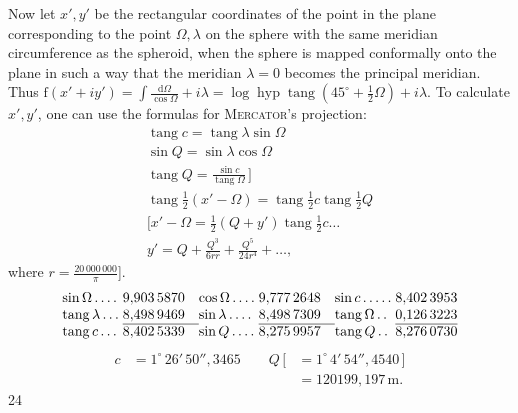 Now let \(x',y'\) be the rectangular coordinates of the point in the plane corresponding to the point \(\Omega,\lambda\) on the sphere with the same meridian circumference as the spheroid, when the sphere is mapped conformally onto the plane in such a way that the meridian \(\lambda=0\) becomes the principal meridian. Thus \(\mathrm{f}(x'+iy')=\int\frac{\mathrm{d}\Omega}{\cos\Omega}+i\lambda=\log\operatorname{hyp}\operatorname{tang}(45^\circ+\frac12\Omega)+i\lambda\). To calculate \(x',y'\), one can use the formulas for \textsc{Mercator}'s projection:
\[
\begin{gathered}
\operatorname{tang}c=\operatorname{tang}\lambda\sin\Omega\\
\sin Q=\sin\lambda\cos\Omega\\
\operatorname{tang}Q=\frac{\sin c}{\operatorname{tang}\Omega}\,]\\
\operatorname{tang}\tfrac12(x'-\Omega)=\operatorname{tang}\tfrac12c\operatorname{tang}\tfrac12Q\\
{[}x'-\Omega=\tfrac12(Q+y')\operatorname{tang}\tfrac12c\ldots\\
y'=Q+\frac{Q^3}{6rr}+\frac{Q^5}{24r^4}+\ldots,
\end{gathered}
\]
\noindent where \(r=\frac{20\,000\,000}{\pi}\)].
\[
\begin{array}{@{}l@{\;}r@{\quad}l@{\;}r@{\quad}l@{\;}r@{}}
\sin\Omega\,.\,.\,.\,.&9{,}903\,5870&\cos\Omega\,.\,.\,.\,.&9{,}777\,2648&\sin c\,.\,.\,.\,.\,.&8{,}402\,3953\\
\operatorname{tang}\lambda\,.\,.\,.&8{,}498\,9469&\sin\lambda\,.\,.\,.\,.&8{,}498\,7309&\operatorname{tang}\Omega\,.\,.&0{,}126\,3223\\\cline{2-2}\cline{4-4}\cline{6-6}
\operatorname{tang}c\,.\,.\,.&8{,}402\,5339&\sin Q\,.\,.\,.\,.&8{,}275\,9957&\operatorname{tang}Q\,.\,.&8{,}276\,0730
\end{array}
\]
\[
\begin{aligned}
c&=1^\circ\,26'\,50''{,}3465\qquad
Q\,[&=1^\circ\,4'\,54''{,}4540\,]\\
&&=120199{,}197\,\mathrm{m}.
\end{aligned}
\]
\hfill{\small24}\hspace*{.12\linewidth}\par


